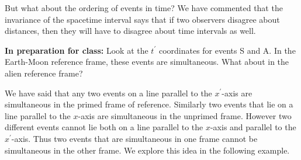     But what about the ordering of events in time?  We have commented
that the invariance of the spacetime interval says that if two
observers disagree about distances, then they will have to disagree
about time intervals as well.
    
\begin{lemma}\textbf{In preparation for class:} Look at the $t^\prime$ coordinates for events
S and A.  In the Earth-Moon reference frame, these events are simultaneous.
What about in the alien reference frame?
\end{lemma}

We have said that any two events on a line parallel to the
$x^\prime$-axis are simultaneous in the primed frame of reference.
Similarly two events that lie on a line parallel to the $x$-axis are
simultaneous in the unprimed frame.  However two different events
cannot lie both on a line parallel to the $x$-axis and parallel to the
$x^\prime$-axis.  Thus two events that are simultaneous in one frame cannot
be simultaneous in the other frame.  We explore this idea in the
following example.

